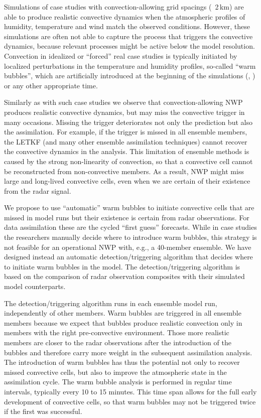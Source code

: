 \documentclass[10pt,a4paper,twoside,headinclude,footinclude,parskip=half]{scrartcl}
\newcommand{\myaktuellesection}{sec:intro}%
\newcommand{\labelsec}[1]{\label{#1}\renewcommand{\myaktuellesection}{#1}}%
\newcommand{\labelsec}[1]{\label{#1}}%
\newcommand{\citeNPK}[1]{\citeauthor{#1}, \citeyear{#1}}
\begin{document}
\labelsec{sec:warmbub:gen}

Simulations of case studies with convection-allowing grid spacings (~2\,km) are able to produce realistic convective
dynamics when the atmospheric profiles of humidity, temperature and wind match the observed conditions.
However, these simulations are often not able to capture the process that triggers the convective dynamics,
because relevant processes might be active below the model resolution.
Convection in idealized or ``forced'' real case studies is typically initiated by localized perturbations in the temperature and humidity profiles,
so-called ``warm bubbles'', which are artificially introduced at the beginning of the simulations (\citeNPK{weisman1982}) or any other appropriate time.
 
Similarly as with such case studies we observe that convection-allowing NWP produces realistic convective dynamics,
but may miss the convective trigger in many occasions. Missing the trigger deteriorates not only the prediction but also the assimilation.
For example, if the trigger is missed in all ensemble members, the LETKF (and many other ensemble assimilation techniques)
cannot recover the convective dynamics in the analysis. This limitation of ensemble methods is caused by the strong non-linearity of convection,
so that a convective cell cannot be reconstructed from non-convective members. As a result, NWP might miss large and long-lived convective cells,
even when we are certain of their existence from the radar signal.

We propose to use ``automatic'' warm bubbles to initiate convective cells that are missed in model runs 
but their existence is certain from radar observations. For data assimilation these are the cycled ``first guess'' forecasts.
While in case studies the researchers manually decide where to introduce warm bubbles,
this strategy is not feasible for an operational NWP with, e.g., a 40-member ensemble.
We have designed instead an automatic detection/triggering algorithm that decides where to initiate warm bubbles in the model.
The detection/triggering algorithm is based on the comparison of radar observation composites with their  simulated model counterparts.

The detection/triggering algorithm runs in each ensemble model run, independently of other members.
Warm bubbles are triggered in all ensemble members because we expect that bubbles produce realistic
convection only in members with the right pre-convective environment.
Those more realistic members are closer to the radar observations after the introduction of the bubbles and therefore
carry more weight in the subsequent assimilation analysis.
The introduction of warm bubbles has thus the potential not only to recover missed convective cells,
but also to improve the atmospheric state in the assimilation cycle.
The warm bubble analysis is performed in regular time intervals, typically every 10 to 15 minutes. This time span allows for the full early development of convective cells,
so that warm bubbles may not be triggered twice if the first was successful.
\end{document}
